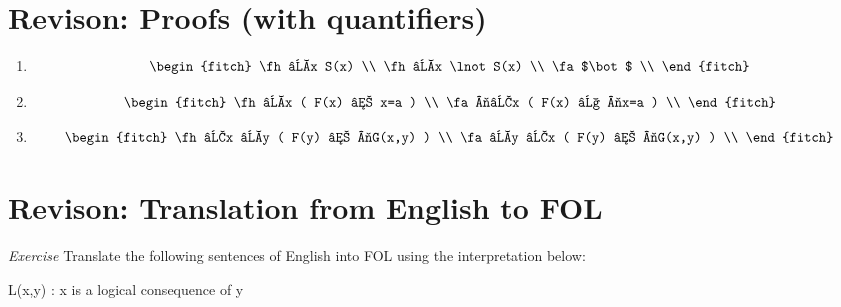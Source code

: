 \documentclass[12pt]{extarticle}
\begin{document}
\begin{multicols*}{3}
\begin{enumerate}
\end{enumerate}
 
 
 
\section{Revison: Proofs (with quantifiers)}
 
\begin{enumerate}
 
\item
 
\begin{equation*}
\begin{fitch}
\fh ∀x S(x) \\
\fh ∀x \lnot S(x) \\
\fa $\bot$ \\
\end{fitch}
\end{equation*}
 
\item
 
\begin{equation*}
\begin{fitch}
\fh ∀x ( F(x) → x=a ) \\
\fa ¬∃x ( F(x) ∧ ¬x=a ) \\
\end{fitch}
\end{equation*}
 
\item
 
\begin{equation*}
\begin{fitch}
\fh ∃x ∀y ( F(y) → ¬G(x,y) ) \\
\fa ∀y ∃x ( F(y) → ¬G(x,y) ) \\
\end{fitch}
\end{equation*}
 
\end{enumerate}
 
 
 
\section{Revison: Translation from English to FOL}
 
\emph{Exercise} Translate the following sentences of English into FOL using the interpretation below:
 
\hspace{5mm} L(x,y)	: x is a logical consequence of y
 

\end{multicols*}
\end{document}
